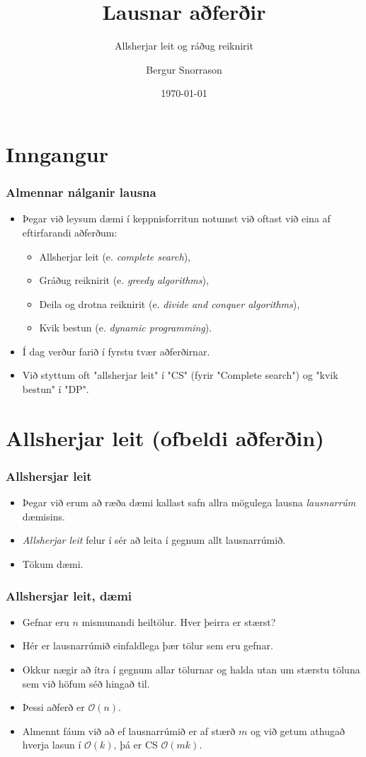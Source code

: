 \documentclass{beamer}
\title{Lausnar aðferðir}
\subtitle{Allsherjar leit og ráðug reiknirit}
\author{Bergur Snorrason}
\date{\today}
\renewcommand\O{\mathcal{O}}
\begin{document}
\frame{\titlepage}

\section{Inngangur}

\begin{frame}
	\frametitle{Almennar nálganir lausna}
\begin{itemize}
	\item<1-> Þegar við leysum dæmi í keppnisforritun notumst við oftast við eina af eftirfarandi aðferðum:
	\begin{itemize}
		\item<2-> Allsherjar leit (e. \emph{complete search}),
		\item<3-> Gráðug reiknirit (e. \emph{greedy algorithms}),
		\item<4-> Deila og drotna reiknirit (e. \emph{divide and conquer algorithms}),
		\item<5-> Kvik bestun (e. \emph{dynamic programming}).
	\end{itemize}
	\item<6-> Í dag verður farið í fyrstu tvær aðferðirnar.
	\item<7-> Við styttum oft "allsherjar leit" í "CS" (fyrir "Complete search") og "kvik bestun" í "DP".
\end{itemize}
\end{frame}

\section{Allsherjar leit (ofbeldi aðferðin)}

\begin{frame}
	\frametitle{Allshersjar leit}
\begin{itemize}
	\item<1-> Þegar við erum að ræða dæmi kallast safn allra mögulega lausna \emph{lausnarrúm} dæmisins.
	\item<2-> \emph{Allsherjar leit} felur í sér að leita í gegnum allt lausnarrúmið.
	\item<3-> Tökum dæmi.
\end{itemize}
\end{frame}

\begin{frame}
	\frametitle{Allshersjar leit, dæmi}
\begin{itemize}
	\item<1-> Gefnar eru $n$ mismunandi heiltölur. Hver þeirra er stærst?
	\item<2-> Hér er lausnarrúmið einfaldlega þær tölur sem eru gefnar.
	\item<3-> Okkur nægir að ítra í gegnum allar tölurnar og halda utan um stærstu töluna sem við höfum séð hingað til.
	\item<4-> Þessi aðferð er $\O(n)$.
	\item<5-> Almennt fáum við að ef lausnarrúmið er af stærð $m$ og við getum athugað hverja lasun í $\O(k)$, þá er CS $\O(mk)$.
\end{itemize}
\end{frame}
\end{document}
